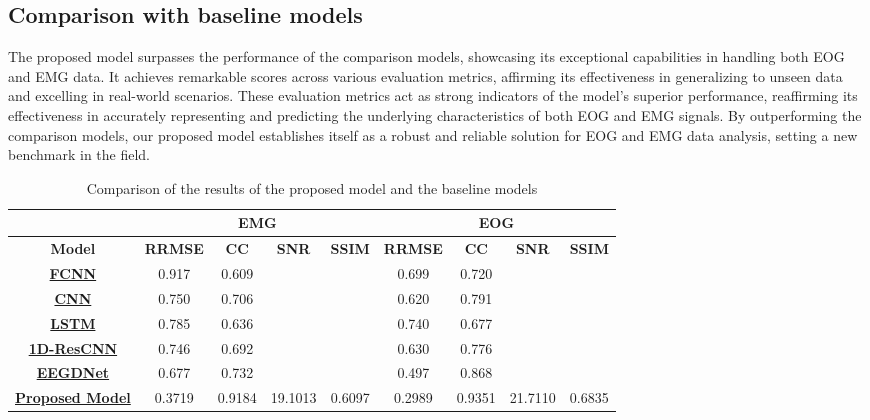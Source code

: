 \documentclass[a4paper, noexaminfo]{sapthesis}
\begin{document}
\subsection{Comparison with baseline models}
The proposed model surpasses the performance of the comparison models, 
showcasing its exceptional capabilities in handling both EOG and EMG data. 
It achieves remarkable scores across various evaluation metrics, 
affirming its effectiveness in generalizing to unseen data and 
excelling in real-world scenarios. These evaluation metrics act as 
strong indicators of the model's superior performance, reaffirming 
its effectiveness in accurately representing and predicting the 
underlying characteristics of both EOG and EMG signals. 
By outperforming the comparison models, our proposed model 
establishes itself as a robust and reliable solution for 
EOG and EMG data analysis, setting a new benchmark in the field. 
\begin{table}[h!]
\centering
\caption{Comparison of the results of the proposed model and the baseline models}
\label{tab:results}
\begin{adjustbox}{max width=\textwidth}
\begin{tabular}{|c|c|c|c|c|c|c|c|c|}
\hline
\multicolumn{1}{|c|}{} & \multicolumn{4}{c|}{\textbf{EMG}} & \multicolumn{4}{c|}{\textbf{EOG}} \\ \cline{2-7}
\hline
\textbf{Model} & \textbf{RRMSE} & \textbf{CC} & \textbf{SNR} & \textbf{SSIM} & \textbf{RRMSE} & \textbf{CC} & \textbf{SNR} & \textbf{SSIM} \\ 
\hline
\textbf{\hyperref[sec:model_fcnn]{FCNN}} & 0.917 & 0.609 &  & 
 & 0.699 & 0.720 & &  \\
\hline
\textbf{\hyperref[sec:model_cnn]{CNN}} & 0.750 & 0.706 & & 
& 0.620 & 0.791  & & \\
\hline
\textbf{\hyperref[sec:model_lstm]{LSTM}} & 0.785 & 0.636
& & &
0.740 & 0.677  &  & \\
\hline
\textbf{\hyperref[sec:1D-ResCNN]{1D-ResCNN}} & 0.746 & 0.692 & & & 0.630 & 0.776 & & \\
\hline
\textbf{\hyperref[sec:EEGDNet]{EEGDNet}} &0.677 & 0.732 & &  & 0.497 & 0.868 &  & \\
\hline
\textbf{\hyperref[sec:model_proposed]{Proposed Model}} & 0.3719	&0.9184	&19.1013	&0.6097 & 0.2989&0.9351&21.7110 &0.6835


\\
\hline
\end{tabular}
\end{adjustbox}
\end{table}
\end{document}
